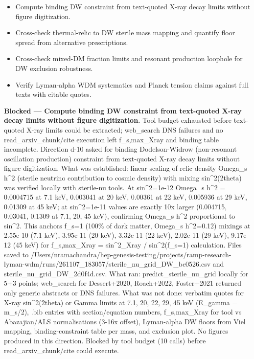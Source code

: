 \documentclass[11pt,a4paper]{article}
\begin{document}
\begin{itemize}
  \item Compute binding DW constraint from text-quoted X-ray decay limits without figure digitization.
  \item Cross-check thermal-relic to DW sterile mass mapping and quantify floor spread from alternative prescriptions.
  \item Cross-check mixed-DM fraction limits and resonant production loophole for DW exclusion robustness.
  \item Verify Lyman-alpha WDM systematics and Planck tension claims against full texts with citable quotes.
\end{itemize}
\textbf{Blocked --- Compute binding DW constraint from text-quoted X-ray decay limits without figure digitization.} Tool budget exhausted before text-quoted X-ray limits could be extracted; web\_search DNS failures and no read\_arxiv\_chunk/cite execution left f\_s,max\_Xray and binding table incomplete. Direction d-10 asked for binding Dodelson-Widrow (non-resonant oscillation production) constraint from text-quoted X-ray decay limits without figure digitization. What was established: linear scaling of relic density Omega\_s h\textasciicircum{}2 (sterile neutrino contribution to cosmic density) with mixing sin\textasciicircum{}2(2theta) was verified locally with sterile-nu tools. At sin\textasciicircum{}2=1e-12 Omega\_s h\textasciicircum{}2 = 0.0004715 at 7.1 keV, 0.003041 at 20 keV, 0.00361 at 22 keV, 0.005936 at 29 keV, 0.01309 at 45 keV; at sin\textasciicircum{}2=1e-11 values are exactly 10x larger (0.004715, 0.03041, 0.1309 at 7.1, 20, 45 keV), confirming Omega\_s h\textasciicircum{}2 proportional to sin\textasciicircum{}2. This anchors f\_s=1 (100\% of dark matter, Omega\_s h\textasciicircum{}2=0.12) mixings at 2.55e-10 (7.1 keV), 3.95e-11 (20 keV), 3.32e-11 (22 keV), 2.02e-11 (29 keV), 9.17e-12 (45 keV) for f\_s,max\_Xray = sin\textasciicircum{}2\_Xray / sin\textasciicircum{}2(f\_s=1) calculation. Files saved to /Users/nramachandra/hep-genesis-testing/projects/ramp-research-lyman-wdm/runs/261107\_183057/sterile\_nu\_grid\_DW\_bc0526.csv and sterile\_nu\_grid\_DW\_2d0f4d.csv. What ran: predict\_sterile\_nu\_grid locally for 5+3 points; web\_search for Dessert+2020, Roach+2022, Foster+2021 returned only generic abstracts or DNS failures. What was not done: verbatim quotes for X-ray sin\textasciicircum{}2(2theta) or Gamma limits at 7.1, 20, 22, 29, 45 keV (E\_gamma = m\_s/2), .bib entries with section/equation numbers, f\_s,max\_Xray for tool vs Abazajian/ALS normalisations (3-16x offset), Lyman-alpha DW floors from Viel mapping, binding-constraint table per mass, and exclusion plot. No figures produced in this direction. Blocked by tool budget (10 calls) before read\_arxiv\_chunk/cite could execute.
\end{document}
